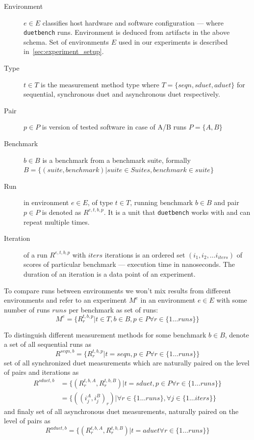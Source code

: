\begin{description}
    \item[Environment] $e \in E$ classifies host hardware and software configuration --- where \lstinline{duetbench} runs.
        Environment is deduced from artifacts in the above schema.
        Set of environments $E$ used in our experiments is described in~\cref{sec:experiment_setup}.
    \item[Type] $t \in T$ is the measurement method type where $T = \{seqn, sduet, aduet\}$ for sequential, synchronous duet and asynchronous duet respectively.
    \item[Pair] $p \in P$ is version of tested software in case of A/B runs $P = \{A, B\}$
    \item[Benchmark] $b \in B$ is a benchmark from a benchmark suite, formally $B = \{(suite, benchmark) | suite \in Suites, benchmark \in suite\}$
    \item[Run] in environment $e \in E$, of type $t \in T$, running benchmark $b \in B$ and pair $p \in P$ is denoted as $R^{e, t, b, p}$.
        It is a unit that \lstinline{duetbench} works with and can repeat multiple times.
    \item[Iteration] of a run $R^{e, t, b, p}$ with $iters$ iterations is an ordered set $(i_1, i_2, \dots i_{iters})$ of scores of particular benchmark --- execution time in nanoseconds.
        The duration of an iteration is a data point of an experiment.
\end{description}

To compare runs between environments we won't mix results from different environments and refer to an experiment $M^e$ in an environment $e \in E$ with some number of runs $runs$ per benchmark as set of runs:
\[M^e = \{R^{t, b, p}_r | t \in T, b \in B, p \in P \forall r \in \{1 \dots runs\}\}\]

To distinguish different measurement methods for some benchmark $b \in B$, denote a set of all sequential runs as
\[R^{seqn, b} = \{R^{t, b, p}_r | t = seqn, p \in P \forall r \in \{1 \dots runs\}\}\]
set of all synchronized duet measurements which are naturally paired on the level of pairs and iterations as
\begin{align*}
R^{sduet, b} &= \{(R^{t, b, A}_r, R^{t, b, B}_r) | t = sduet, p \in P \forall r \in \{1 \dots runs\}\} \\
             &= \{((i^A_j, i^B_j)_r) | \forall r \in \{1 \dots runs\}, \forall j \in \{1 \dots iters\}\}
\end{align*}
and finaly set of all asynchronous duet measurements, naturally paired on the level of pairs as
\[R^{aduet, b} = \{(R^{t, b, A}_r, R^{t, b, B}_r) | t = aduet \forall r \in \{1 \dots runs\}\}\]

